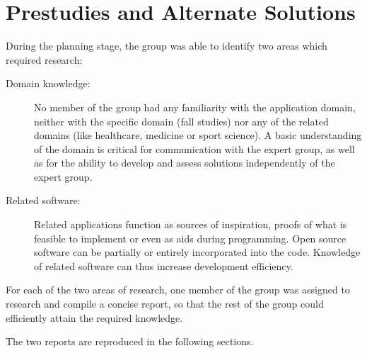 \chapter{Prestudies and Alternate Solutions}
During the planning stage, the group was able to identify two areas which required research:
\begin{description}
\item[Domain knowledge:] No member of the group had any familiarity with the application domain, neither with the specific domain (fall studies) nor any of the related domains (like healthcare, medicine or sport science). A basic understanding of the domain is critical for communication with the expert group, as well as for the ability to develop and assess solutions independently of the expert group.
\item[Related software:] Related applications function as sources of inspiration, proofs of what is feasible to implement or even as aids during programming. Open source software can be partially or entirely incorporated into the code. Knowledge of related software can thus increase development efficiency.  
\end{description}
For each of the two areas of research, one member of the group was assigned to research and compile a concise report, so that the rest of the group could efficiently attain the required knowledge.   

The two reports are reproduced in the following sections.







